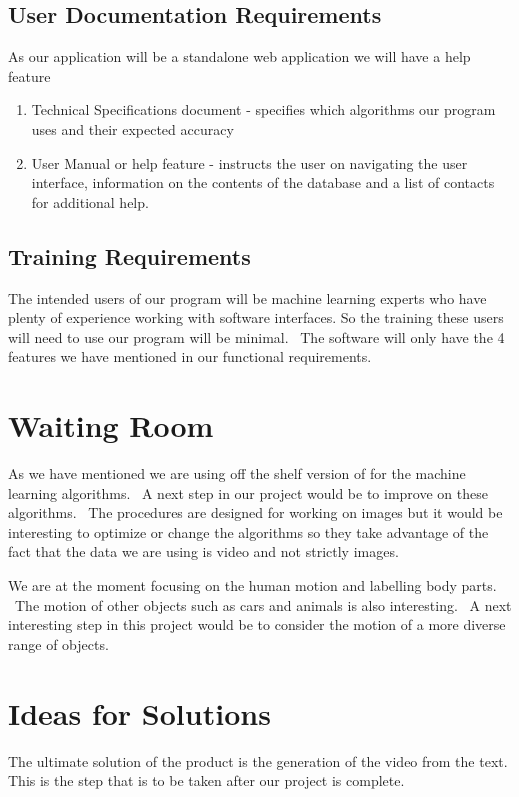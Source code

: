 \documentclass{scrreprt}
\providecommand{\tightlist}{%
  \setlength{\itemsep}{0pt}\setlength{\parskip}{0pt}}
\begin{document}
\subsection{User Documentation Requirements}

{As our application will be a standalone web application we will have a
help feature}

\begin{enumerate}
\tightlist
\item
  {Technical Specifications document - specifies which algorithms our
  program uses and their expected accuracy}
\item
  {User Manual or help feature - instructs the user on navigating the
  user interface, information on the contents of the database and a list
  of contacts for additional help.}
\end{enumerate}

\subsection{Training Requirements}

{The intended users of our program will be machine learning experts who
have plenty of experience working with software interfaces. So the
training these users will need to use our program will be minimal. ~The
software will only have the 4 features we have mentioned in our
functional requirements.}

\section{Waiting Room}

{As we have mentioned we are using off the shelf version of for the
machine learning algorithms. ~A next step in our project would be to
improve on these algorithms. ~The procedures are designed for working on
images but it would be interesting to optimize or change the algorithms
so they take advantage of the fact that the data we are using is video
and not strictly images.}

{We are at the moment focusing on the human motion and labelling body
parts. ~The motion of other objects such as cars and animals is also
interesting. ~A next interesting step in this project would be to
consider the motion of a more diverse range of objects.}

\section{Ideas for Solutions}

{The ultimate solution of the product is the generation of the video
from the text. This is the step that is to be taken after our project is
complete. ~}



\end{document}
